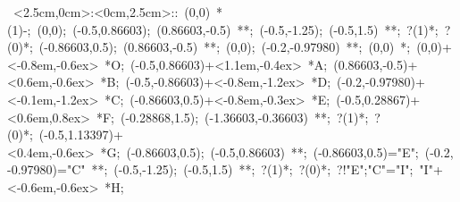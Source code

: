 %


\hbox{
\xy    <2.5cm,0cm>:<0cm,2.5cm>::
       (0,0) *\ellipse(1){-}; (0,0); 
       (-0.5,0.86603); (0.86603,-0.5) **\dir{-}; 
       (-0.5,-1.25); (-0.5,1.5) **\dir{-};  ?(1)*\dir{>};  ?(0)*\dir{<};
       (-0.86603,0.5); (0.86603,-0.5) **\dir{-}; 
       (0,0); (-0.2,-0.97980) **\dir{-};
       (0,0) *{\bullet};
       (0,0)+<-0.8em,-0.6ex> *{O};
       (-0.5,0.86603)+<1.1em,-0.4ex> *{A};
       (0.86603,-0.5)+<0.6em,-0.6ex> *{B};
       (-0.5,-0.86603)+<-0.8em,-1.2ex> *{D};
       (-0.2,-0.97980)+<-0.1em,-1.2ex> *{C};
       (-0.86603,0.5)+<-0.8em,-0.3ex> *{E};
       (-0.5,0.28867)+<0.6em,0.8ex> *{F};
       (-0.28868,1.5); (-1.36603,-0.36603) **\dir{-};  ?(1)*\dir{>};  ?(0)*\dir{<};
       (-0.5,1.13397)+<0.4em,-0.6ex> *{G};
       (-0.86603,0.5); (-0.5,0.86603) **\dir{-}; 
       (-0.86603,0.5)="E"; (-0.2,-0.97980)="C" **\dir{-}; 
       (-0.5,-1.25); (-0.5,1.5) **\dir{-};  ?(1)*\dir{>};  ?(0)*\dir{<};
       ?!{"E";"C"}="I";
       "I"+<-0.6em,-0.6ex> *{H};
\endxy}

